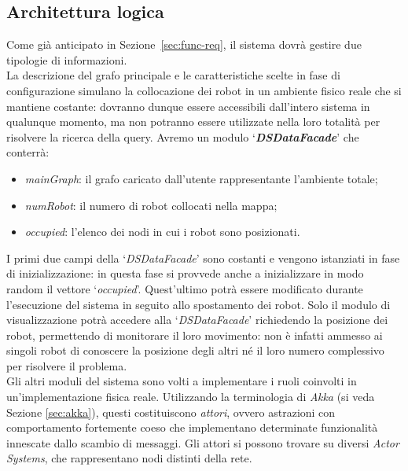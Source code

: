 
\subsection{Architettura logica}
\label{sec:logical-arch}
Come già anticipato in Sezione~\ref{sec:func-req},
il sistema dovrà gestire due tipologie di informazioni.\\

La descrizione del grafo principale e le caratteristiche scelte
in fase di configurazione simulano la collocazione dei robot in
un ambiente fisico reale che si mantiene costante: dovranno dunque
essere accessibili dall'intero sistema in qualunque momento,
ma non potranno essere utilizzate
nella loro totalità
per risolvere la ricerca della query.
Avremo un modulo `\textbf{\emph{DSDataFacade}}' che conterrà:
\begin{itemize}
\item \emph{mainGraph}: il grafo caricato dall'utente rappresentante
  l'ambiente totale;
\item \emph{numRobot}: il numero di robot collocati nella mappa;
\item \emph{occupied}: l'elenco dei nodi in cui i robot sono posizionati.
\end{itemize}
I primi due campi della `\emph{DSDataFacade}' sono costanti e vengono
istanziati in fase di inizializzazione: in questa fase si provvede anche
a inizializzare in modo random il vettore `\emph{occupied}'. Quest'ultimo
potrà essere modificato durante l'esecuzione del sistema in seguito allo
spostamento dei robot.
Solo il modulo di visualizzazione potrà accedere alla `\emph{DSDataFacade}'
richiedendo la posizione dei robot, permettendo di monitorare
il loro movimento: non è infatti ammesso ai singoli robot di conoscere
la posizione degli altri né il loro numero complessivo per risolvere
il problema.\\

Gli altri moduli del sistema sono volti a implementare i
ruoli coinvolti in un'implementazione fisica reale.
Utilizzando la terminologia di \emph{Akka} (si veda Sezione \ref{sec:akka}), questi costituiscono
\emph{attori}, ovvero astrazioni con comportamento fortemente coeso
che implementano determinate funzionalità innescate dallo scambio di
messaggi. Gli attori si possono trovare su diversi \emph{Actor Systems},
che rappresentano nodi distinti della rete.

